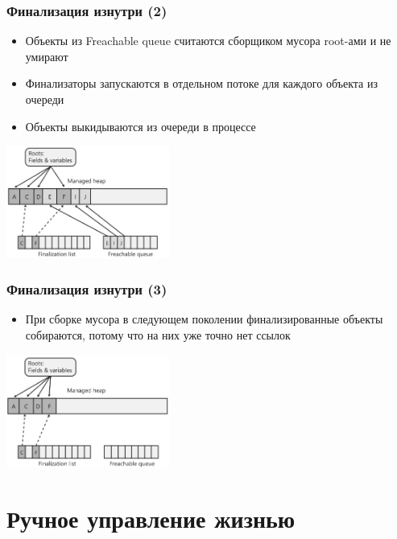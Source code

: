 \documentclass[xetex,mathserif,serif]{beamer}
\begin{document}
	\begin{frame}
		\frametitle{Финализация изнутри (2)}
		\begin{itemize}
			\item Объекты из Freachable queue считаются сборщиком мусора root-ами и не умирают
			\item Финализаторы запускаются в отдельном потоке для каждого объекта из очереди
			\item Объекты выкидываются из очереди в процессе
		\end{itemize}
		\begin{center}
			\includegraphics[width=0.4\textwidth]{freachableQueue.png}
		\end{center}
	\end{frame}

	\begin{frame}
		\frametitle{Финализация изнутри (3)}
		\begin{itemize}
			\item При сборке мусора в следующем поколении финализированные объекты собираются, потому что на них уже точно нет ссылок
		\end{itemize}
		\begin{center}
			\includegraphics[width=0.4\textwidth]{finalizationDone.png}
		\end{center}
	\end{frame}

	\section{Ручное управление жизнью}
\end{document}
